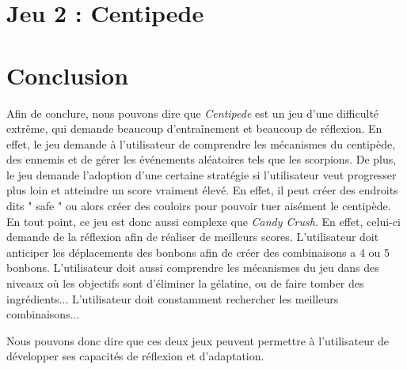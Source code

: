 \documentclass[a4paper, 12pt, oneside]{article}
\newcommand{\oeuvre}[1]{\textit{#1}}
\newcommand{\Candy}{\oeuvre{Candy Crush}\xspace} %
\newcommand{\Centi}{\oeuvre{Centipede}\xspace}
\begin{document}
\section{Jeu 2 : Centipede}


\section{Conclusion}
Afin de conclure, nous pouvons dire que \Centi est un jeu d'une difficulté extrême, qui demande beaucoup d'entraînement et beaucoup de réflexion. En effet, le jeu demande à l'utilisateur de comprendre les mécanismes du centipède, des ennemis et de gérer les événements aléatoires tels que les scorpions. De plus, le jeu demande l'adoption d'une certaine stratégie si l'utilisateur veut progresser plus loin et atteindre un score vraiment élevé. En effet, il peut créer des endroits dits " safe " ou alors créer des couloirs pour pouvoir tuer aisément le centipède. En tout point, ce jeu est donc aussi complexe que \Candy. En effet, celui-ci demande de la réflexion afin de réaliser de meilleurs scores. L'utilisateur doit anticiper les déplacements des bonbons afin de créer des combinaisons a 4 ou 5 bonbons. L'utilisateur doit aussi comprendre les mécanismes du jeu dans des niveaux où les objectifs sont d'éliminer la gélatine, ou de faire tomber des ingrédients... L'utilisateur doit constamment rechercher les meilleurs combinaisons... 

Nous pouvons donc dire que ces deux jeux peuvent permettre à l'utilisateur de développer ses capacités de réflexion et d'adaptation.
\end{document}
